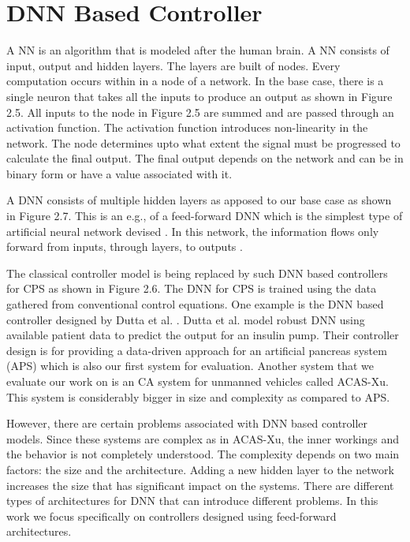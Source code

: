  
\section{DNN Based Controller}


A \ac{NN} is an algorithm that is modeled after the human brain.
A \ac{NN} consists of input, output and hidden layers. 
The layers are built of nodes. Every computation occurs within in a node of a network.
In the base case, there is a single neuron that takes all the inputs to produce an output as shown in Figure 2.5. 
All inputs to the node in Figure 2.5 are summed and are passed through an activation function. 
The activation function introduces non-linearity in the network. 
The node determines upto what extent the signal must be progressed to calculate the final output. 
The final output depends on the network and can be in binary form or have a value associated with it. 


A \ac{DNN} consists of multiple hidden layers as apposed to our base case  as shown in Figure 2.7.
This is an e.g., of a feed-forward \ac{DNN} which is the simplest type of artificial neural network devised \cite{feedforward}.
In this network, the information flows only forward from inputs, through layers, to outputs \cite{Zell}. 

The classical controller model is being replaced by such DNN based controllers for CPS as shown in  Figure 2.6.
The \ac{DNN} for \ac*{CPS} is trained using the data gathered from conventional control equations. 
One example is the DNN based controller designed by Dutta et al. \cite{Dutta_Others__2018__Robust}. 
Dutta et al. model robust DNN using available patient data to predict the output for an insulin pump.
Their controller design is for providing a data-driven approach for an artificial pancreas system (APS) which is also our first system for evaluation. 
Another system that we evaluate our work on is an \ac{CA} system for unmanned vehicles \cite{7778055} called ACAS-Xu. This system is considerably bigger in size and complexity as compared to \ac{APS}. 

However,  there are certain  problems associated with \ac{DNN} based controller models. 
Since these systems are complex as in \ac{ACAS-Xu}, the inner workings and the behavior is not completely understood. 
The complexity depends on  two main factors: the size and the architecture. Adding a new hidden layer to the network increases the size that has  significant impact on the systems.  
There are different types of architectures for \ac{DNN} that can introduce different problems. In this work we focus specifically on controllers designed  using feed-forward architectures.  

